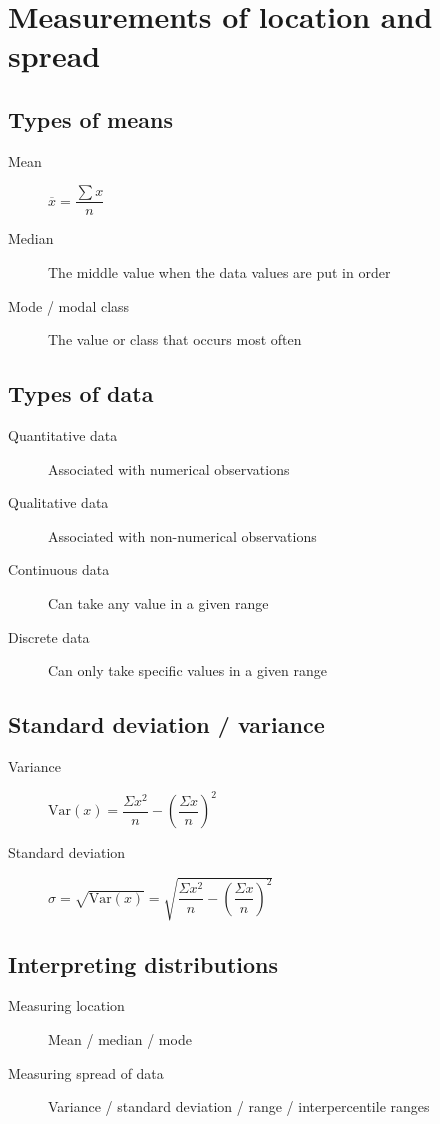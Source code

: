 \documentclass[oneside,fleqn,11pt]{book}
\begin{document}
	\pagebreak
	
	
	\chapter{Measurements of location and spread}
	\section{Types of means}
	\begin{description}
		\item[Mean] $\overline{x}=\dfrac{\sum x}{n}$
		\item[Median] The middle value when the data values are put in order
		\item[Mode / modal class] The value or class that occurs most often
	\end{description}
	
	\section{Types of data}
	\begin{description}
		\item[Quantitative data] Associated with numerical observations
		\item[Qualitative data] Associated with non-numerical observations
		\item[Continuous data] Can take any value in a given range
		\item[Discrete data] Can only take specific values in a given range
	\end{description}
	
	\section{Standard deviation / variance}
	\begin{description}
		\item[Variance] $\mathrm{Var}(x)=\dfrac{\Sigma x^2}{n} - (\dfrac{\Sigma x}{n})^2$
		\item[Standard deviation] $\sigma=\sqrt{\mathrm{Var}(x)}=\sqrt{\dfrac{\Sigma x^2}{n} - (\dfrac{\Sigma x}{n})^2}$
	\end{description}
	
	\section{Interpreting distributions}
	\begin{description}
		\item[Measuring location] Mean / median / mode
		\item[Measuring spread of data] Variance / standard deviation / range / interpercentile ranges
	\end{description}
	
\end{document}
